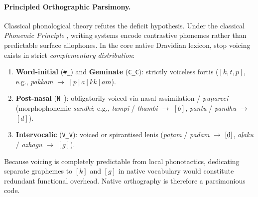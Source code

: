 \documentclass[11pt]{article}
\begin{document}
\paragraph{Principled Orthographic Parsimony.}
Classical phonological theory refutes the deficit hypothesis. Under the classical
\emph{Phonemic Principle} \cite{swadesh-1934-phonemic,caldwell1875comparative,zvelebil1970dravidian,lakshmanan2025biconsonantal},
writing systems encode contrastive phonemes rather than predictable surface allophones. In the
core native Dravidian lexicon, stop voicing exists in strict \emph{complementary distribution}:
\begin{enumerate}
    \item \textbf{Word-initial} (\texttt{\#\_}) and \textbf{Geminate} (\texttt{C\_C}): strictly
    voiceless fortis ($[k, t, p]$, e.g., \textit{pakkam} $\rightarrow$ $[p]a[kk]am$).
    \item \textbf{Post-nasal} (\texttt{N\_}): obligatorily voiced via nasal assimilation /
    \textit{puṇarcci} (morphophonemic \textit{sandhi}; e.g., \textit{tampi} / \textit{thambi} $\rightarrow$ $[b]$, \textit{pantu} / \textit{pandhu} $\rightarrow$ $[d]$).
    \item \textbf{Intervocalic} (\texttt{V\_V}): voiced or spirantised lenis (\textit{pa\d{t}am} / \textit{padam}
    $\rightarrow$ $[\text{\d{d}}]$, \textit{a\underline{l}aku} / \textit{azhagu} $\rightarrow$ $[g]$).
\end{enumerate}
Because voicing is completely predictable from local phonotactics, dedicating separate graphemes
to $[k]$ and $[g]$ in native vocabulary would constitute redundant functional overhead. Native
orthography is therefore a parsimonious code.
\end{document}
